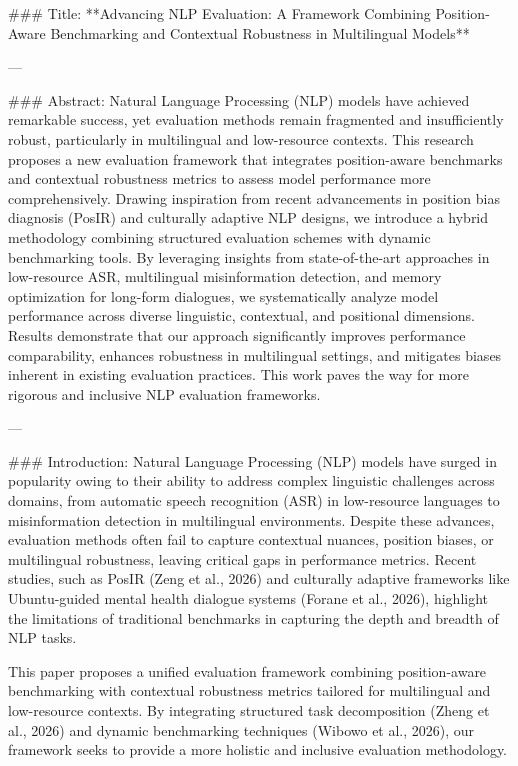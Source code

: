 ### Title:  
**Advancing NLP Evaluation: A Framework Combining Position-Aware Benchmarking and Contextual Robustness in Multilingual Models**

---

### Abstract:  
Natural Language Processing (NLP) models have achieved remarkable success, yet evaluation methods remain fragmented and insufficiently robust, particularly in multilingual and low-resource contexts. This research proposes a new evaluation framework that integrates position-aware benchmarks and contextual robustness metrics to assess model performance more comprehensively. Drawing inspiration from recent advancements in position bias diagnosis (PosIR) and culturally adaptive NLP designs, we introduce a hybrid methodology combining structured evaluation schemes with dynamic benchmarking tools. By leveraging insights from state-of-the-art approaches in low-resource ASR, multilingual misinformation detection, and memory optimization for long-form dialogues, we systematically analyze model performance across diverse linguistic, contextual, and positional dimensions. Results demonstrate that our approach significantly improves performance comparability, enhances robustness in multilingual settings, and mitigates biases inherent in existing evaluation practices. This work paves the way for more rigorous and inclusive NLP evaluation frameworks.

---

### Introduction:  
Natural Language Processing (NLP) models have surged in popularity owing to their ability to address complex linguistic challenges across domains, from automatic speech recognition (ASR) in low-resource languages to misinformation detection in multilingual environments. Despite these advances, evaluation methods often fail to capture contextual nuances, position biases, or multilingual robustness, leaving critical gaps in performance metrics. Recent studies, such as PosIR (Zeng et al., 2026) and culturally adaptive frameworks like Ubuntu-guided mental health dialogue systems (Forane et al., 2026), highlight the limitations of traditional benchmarks in capturing the depth and breadth of NLP tasks.

This paper proposes a unified evaluation framework combining position-aware benchmarking with contextual robustness metrics tailored for multilingual and low-resource contexts. By integrating structured task decomposition (Zheng et al., 2026) and dynamic benchmarking techniques (Wibowo et al., 2026), our framework seeks to provide a more holistic and inclusive evaluation methodology.

